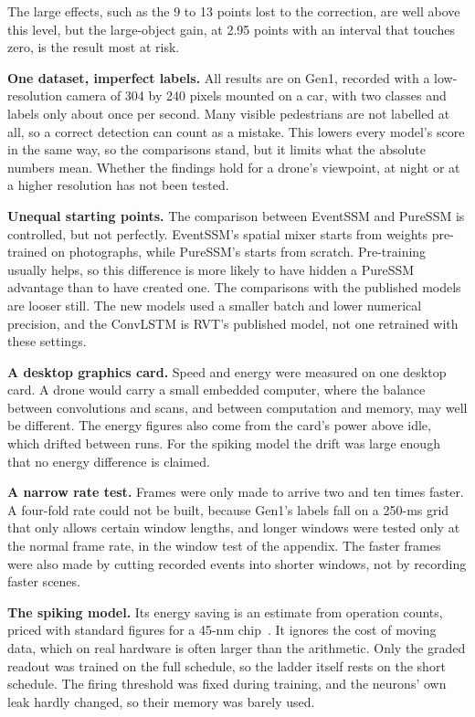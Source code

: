 \documentclass[11pt, a4paper]{report}
\begin{document}
The large effects, such as the 9 to 13 points lost to the correction, are well above this level, but the large-object gain, at 2.95 points with an interval that touches zero, is the result most at risk.

\textbf{One dataset, imperfect labels.} All results are on Gen1, recorded with a low-resolution camera of 304 by 240 pixels mounted on a car, with two classes and labels only about once per second. Many visible pedestrians
are not labelled at all, so a correct detection can count as a mistake. This lowers every model's score in
the same way, so the comparisons stand, but it limits what the absolute numbers mean. Whether the findings
hold for a drone's viewpoint, at night or at a higher resolution has not been tested.

\textbf{Unequal starting points.} The comparison between EventSSM and PureSSM is controlled, but not
perfectly. EventSSM's spatial mixer starts from weights pre-trained on photographs, while PureSSM's starts from
scratch. Pre-training usually helps, so this difference is more likely to have hidden a PureSSM advantage
than to have created one. The comparisons with the published models are looser still. The new models used a
smaller batch and lower numerical precision, and the ConvLSTM is RVT's published model, not one retrained
with these settings.

\textbf{A desktop graphics card.} Speed and energy were measured on one desktop card. A drone would carry a
small embedded computer, where the balance between convolutions and scans, and between computation and
memory, may well be different. The energy figures also come from the card's power above idle, which drifted
between runs. For the spiking model the drift was large enough that no energy difference is claimed.

\textbf{A narrow rate test.} Frames were only made to arrive two and ten times faster. A four-fold rate could
not be built, because Gen1's labels fall on a 250-ms grid that only allows certain window lengths, and longer windows were
tested only at the normal frame rate, in the window test of the appendix. The faster frames were also made by cutting
recorded events into shorter windows, not by recording faster scenes.

\textbf{The spiking model.} Its energy saving is an estimate from operation counts, priced with standard
figures for a 45-nm chip~\cite{horowitz2014computing}. It ignores the cost of moving data, which on real
hardware is often larger than the arithmetic. Only the graded readout was trained on the full schedule, so
the ladder itself rests on the short schedule. The firing threshold was fixed during training, and the
neurons' own leak hardly changed, so their memory was barely used.
\end{document}
